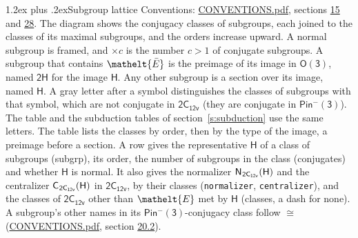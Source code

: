\documentclass[10pt,a4paper]{article}
\makeatletter
\renewcommand\section{\@startsection{section}{1}{\z@}{-3ex plus -1ex minus -.2ex}%
  {1.2ex plus .2ex}{\normalfont\large\sffamily\bfseries\color{parttitle}}}
\numberwithin{equation}{section}
\newcommand{\eltfont}[1]{{\let\sigma\eltsigma\mathelt{#1}}}
\newcommand{\grp}[1]{\mathsf{#1}}
\newcommand{\cls}[1]{\eltfont{#1}}
\newcommand{\elt}[1]{\eltfont{#1}}
\newcommand{\samecls}{\cong}
\newcommand{\barred}[1]{\bar{#1}}
\newcommand{\hairsp}{\mkern1mu}
\makeatother
\begin{document}
\section{Subgroup lattice}\label{s:subgroups}
Conventions: \href{../../CONVENTIONS.pdf}{CONVENTIONS.pdf}, sections \href{../../../rotation/CONVENTIONS.pdf\#conv.15}{15} and \href{../../CONVENTIONS.pdf\#conv.28}{28}.
The diagram shows the conjugacy classes of subgroups, each joined to the classes of its maximal subgroups, and the orders increase upward. A normal subgroup is framed, and ${\times}c$ is the number $c > 1$ of conjugate subgroups. \label{n:group.H}A subgroup that contains $\elt{\barred{E}}$ is the preimage of its image in $\grp{O(3)}$, named $\grp{2H}$ for the image $\grp{H}$. Any other subgroup is a section over its image, named $\grp{H}$. \label{n:mark.letter}A gray letter after a symbol distinguishes the classes of subgroups with that symbol, which are not conjugate in $\grp{2C_{12v}}$ (they are conjugate in \href{Pinminus3.pdf}{$\grp{Pin^{-}(3)}$}). The table and the subduction tables of section~\ref{s:subduction} use the same letters. The table lists the classes by order, then by the type of the image, a preimage before a section. \label{n:head.subgroup}\label{n:head.order}\label{n:head.conjugates}\label{n:head.normal}A row gives the representative $\grp{H}$ of a class of subgroups (subgrp), its order, the number of subgroups in the class (conjugates) and whether $\grp{H}$ is normal. \label{n:group.normalizer}\label{n:group.centralizer}\label{n:head.classes}It also gives the normalizer $\grp{N}_{\hairsp \grp{2C_{12v}}}(\grp{H})$ and the centralizer $\grp{C}_{\hairsp \grp{2C_{12v}}}(\grp{H})$ in $\grp{2C_{12v}}$, by their classes (\texttt{normalizer}, \texttt{centralizer}), and the classes of $\grp{2C_{12v}}$ other than $\cls{E}$ met by $\grp{H}$ (classes, a dash for none). A subgroup's other names in its \href{Pinminus3.pdf}{$\grp{Pin^{-}(3)}$}-conjugacy class follow $\samecls$ (\href{../../CONVENTIONS.pdf}{CONVENTIONS.pdf}, section \href{../../CONVENTIONS.pdf\#conv.20.2}{20.2}).
\end{document}
